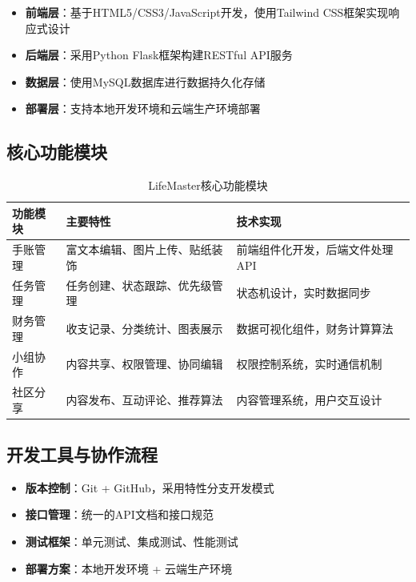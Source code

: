\documentclass[a4paper]{article}
\begin{document}
\begin{itemize}
    \item \textbf{前端层}：基于HTML5/CSS3/JavaScript开发，使用Tailwind CSS框架实现响应式设计
    \item \textbf{后端层}：采用Python Flask框架构建RESTful API服务
    \item \textbf{数据层}：使用MySQL数据库进行数据持久化存储
    \item \textbf{部署层}：支持本地开发环境和云端生产环境部署
\end{itemize}

\subsection{核心功能模块}

\begin{table}[H]
\centering
\begin{tabular}{|l|p{4cm}|p{6cm}|}
\hline
\textbf{功能模块} & \textbf{主要特性} & \textbf{技术实现} \\
\hline
手账管理 & 富文本编辑、图片上传、贴纸装饰 & 前端组件化开发，后端文件处理API \\
\hline
任务管理 & 任务创建、状态跟踪、优先级管理 & 状态机设计，实时数据同步 \\
\hline
财务管理 & 收支记录、分类统计、图表展示 & 数据可视化组件，财务计算算法 \\
\hline
小组协作 & 内容共享、权限管理、协同编辑 & 权限控制系统，实时通信机制 \\
\hline
社区分享 & 内容发布、互动评论、推荐算法 & 内容管理系统，用户交互设计 \\
\hline
\end{tabular}
\caption{LifeMaster核心功能模块}
\end{table}

\subsection{开发工具与协作流程}

\begin{itemize}
    \item \textbf{版本控制}：Git + GitHub，采用特性分支开发模式
    \item \textbf{接口管理}：统一的API文档和接口规范
    \item \textbf{测试框架}：单元测试、集成测试、性能测试
    \item \textbf{部署方案}：本地开发环境 + 云端生产环境
\end{itemize}
\end{document}
